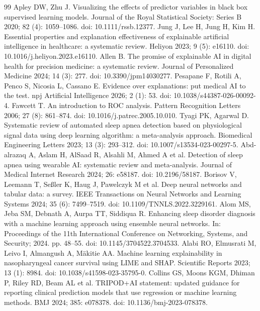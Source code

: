 \documentclass{elektr}
\begin{document}
\begin{thebibliography}{99}
 Apley DW, Zhu J. Visualizing the effects of predictor variables in black box supervised learning models. Journal of the Royal Statistical Society: Series B 2020; 82 (4): 1059--1086. doi: 10.1111/rssb.12377.
 Jung J, Lee H, Jung H, Kim H. Essential properties and explanation effectiveness of explainable artificial intelligence in healthcare: a systematic review. Heliyon 2023; 9 (5): e16110. doi: 10.1016/j.heliyon.2023.e16110.
 Allen B. The promise of explainable AI in digital health for precision medicine: a systematic review. Journal of Personalized Medicine 2024; 14 (3): 277. doi: 10.3390/jpm14030277.
 Pesapane F, Rotili A, Penco S, Nicosia L, Cassano E. Evidence over explanations: put medical AI to the test. npj Artificial Intelligence 2026; 2 (1): 53. doi: 10.1038/s44387-026-00092-4.
 Fawcett T. An introduction to ROC analysis. Pattern Recognition Letters 2006; 27 (8): 861--874. doi: 10.1016/j.patrec.2005.10.010.
 Tyagi PK, Agarwal D. Systematic review of automated sleep apnea detection based on physiological signal data using deep learning algorithm: a meta-analysis approach. Biomedical Engineering Letters 2023; 13 (3): 293--312. doi: 10.1007/s13534-023-00297-5.
 Abd-alrazaq A, Aslam H, AlSaad R, Alsahli M, Ahmed A et al. Detection of sleep apnea using wearable AI: systematic review and meta-analysis. Journal of Medical Internet Research 2024; 26: e58187. doi: 10.2196/58187.
 Borisov V, Leemann T, Se{\ss}ler K, Haug J, Pawelczyk M et al. Deep neural networks and tabular data: a survey. IEEE Transactions on Neural Networks and Learning Systems 2024; 35 (6): 7499--7519. doi: 10.1109/TNNLS.2022.3229161.
 Alom MS, Jeba SM, Debnath A, Aurpa TT, Siddiqua R. Enhancing sleep disorder diagnosis with a machine learning approach using ensemble neural networks. In: Proceedings of the 11th International Conference on Networking, Systems, and Security; 2024. pp. 48--55. doi: 10.1145/3704522.3704533.
 Alabi RO, Elmusrati M, Leivo I, Almangush A, M{\"a}kitie AA. Machine learning explainability in nasopharyngeal cancer survival using LIME and SHAP. Scientific Reports 2023; 13 (1): 8984. doi: 10.1038/s41598-023-35795-0.
 Collins GS, Moons KGM, Dhiman P, Riley RD, Beam AL et al. TRIPOD+AI statement: updated guidance for reporting clinical prediction models that use regression or machine learning methods. BMJ 2024; 385: e078378. doi: 10.1136/bmj-2023-078378.

\end{thebibliography}
\end{document}
